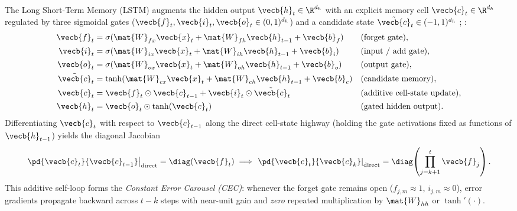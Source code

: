 \documentclass[../../../../master.tex]{subfiles}
\begin{document}
\begin{coremath}
\label{eq:rnn:lstm_box}
The Long Short-Term Memory (LSTM) augments the hidden output $\vecb{h}_t \in \R^{d_h}$ with an explicit memory cell $\vecb{c}_t \in \R^{d_h}$ regulated by three sigmoidal gates ($\vecb{f}_t, \vecb{i}_t, \vecb{o}_t \in (0,1)^{d_h}$) and a candidate state $\tilde{\vecb{c}}_t \in (-1,1)^{d_h}$ ; :
\begin{align}
  \vecb{f}_t &= \sigma(\mat{W}_{fx}\vecb{x}_t + \mat{W}_{fh}\vecb{h}_{t-1} + \vecb{b}_f) && \text{(forget gate)}, \label{eq:rnn:lstm_f} \\
  \vecb{i}_t &= \sigma(\mat{W}_{ix}\vecb{x}_t + \mat{W}_{ih}\vecb{h}_{t-1} + \vecb{b}_i) && \text{(input / add gate)}, \label{eq:rnn:lstm_i} \\
  \vecb{o}_t &= \sigma(\mat{W}_{ox}\vecb{x}_t + \mat{W}_{oh}\vecb{h}_{t-1} + \vecb{b}_o) && \text{(output gate)}, \label{eq:rnn:lstm_o} \\
  \tilde{\vecb{c}}_t &= \tanh(\mat{W}_{cx}\vecb{x}_t + \mat{W}_{ch}\vecb{h}_{t-1} + \vecb{b}_c) && \text{(candidate memory)}, \label{eq:rnn:lstm_cand} \\
  \vecb{c}_t &= \vecb{f}_t \odot \vecb{c}_{t-1} + \vecb{i}_t \odot \tilde{\vecb{c}}_t && \text{(additive cell-state update)}, \label{eq:rnn:lstm_c} \\
  \vecb{h}_t &= \vecb{o}_t \odot \tanh(\vecb{c}_t) && \text{(gated hidden output)}. \label{eq:rnn:lstm_h}
\end{align}
Differentiating $\vecb{c}_t$ with respect to $\vecb{c}_{t-1}$ along the direct cell-state highway (holding the gate activations fixed as functions of $\vecb{h}_{t-1}$) yields the diagonal Jacobian
\begin{equation}
  \left.\pd{\vecb{c}_t}{\vecb{c}_{t-1}}\right|_{\text{direct}} = \diag(\vecb{f}_t)
  \implies
  \left.\pd{\vecb{c}_t}{\vecb{c}_k}\right|_{\text{direct}} = \diag\!\left(\prod_{j=k+1}^{t} \vecb{f}_j\right).
  \label{eq:rnn:lstm_cec}
\end{equation}
This additive self-loop forms the \emph{Constant Error Carousel (CEC)}: whenever the forget gate remains open ($f_{j,m} \approx 1$, $i_{j,m} \approx 0$), error gradients propagate backward across $t-k$ steps with near-unit gain and \emph{zero} repeated multiplication by $\mat{W}_{hh}$ or $\tanh'(\cdot)$.
\end{coremath}
\end{document}
